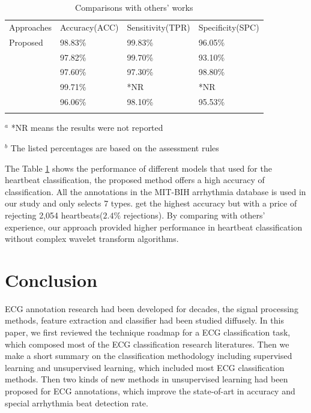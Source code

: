 \documentclass[graybox]{svmult}
\begin{document}
\begin{table}
\caption{Comparisons with others' works}
\label{tab:10}       %
%
%
\begin{tabular}{p{2.9cm}p{2.8cm}p{2.8cm}p{2.8cm}}
\hline\noalign{\smallskip}
Approaches & Accuracy(ACC) & Sensitivity(TPR)  & Specificity(SPC)  \\
\noalign{\smallskip}\svhline\noalign{\smallskip}
Proposed                        & 98.83\%  & 99.83\%    & 96.05\%\\
\citeauthor{tadejko2007}	   & 97.82\%  & 99.70\%     & 93.10\%  \\
\citeauthor{banerjee2014app} & 97.60\%   & 97.30\%    & 98.80\%    \\
\citeauthor{can2012heartbeat}                & 99.71\%   &  *NR          & *NR      \\
\citeauthor{osowski2001ecg}  & 96.06\%   & 98.10\%    & 95.53\%     \\
\noalign{\smallskip}\hline\noalign{\smallskip}
\end{tabular}
$^a$ *NR means the results were not reported

$^b$ The listed percentages are based on the assessment rules
\end{table}


The Table \ref{tab:10} shows the performance of different models that used for the heartbeat classification, the proposed method offers a high accuracy of classification. 
All the annotations in the MIT-BIH arrhythmia database is used in our study and \citet{osowski2001ecg} only selects 7 types. \citet{can2012heartbeat} get the highest accuracy but with a price of rejecting 2,054 heartbeats($2.4\%$ rejections). By comparing with others' experience, our approach provided higher performance in heartbeat classification without complex wavelet transform algorithms. 


\section*{Conclusion}
ECG annotation research had been developed for decades, the signal processing methods, feature extraction and classifier had been studied diffusely. In this paper, we first reviewed the technique roadmap for a ECG classification task, which composed most of the ECG classification research literatures. Then we make a  short summary on the classification methodology including supervised learning and unsupervised learning, which included most ECG classification methods.  Then two kinds of new methods in unsupervised learning had been proposed for ECG annotations, which improve the state-of-art in accuracy and special arrhythmia beat detection rate.
\end{document}
